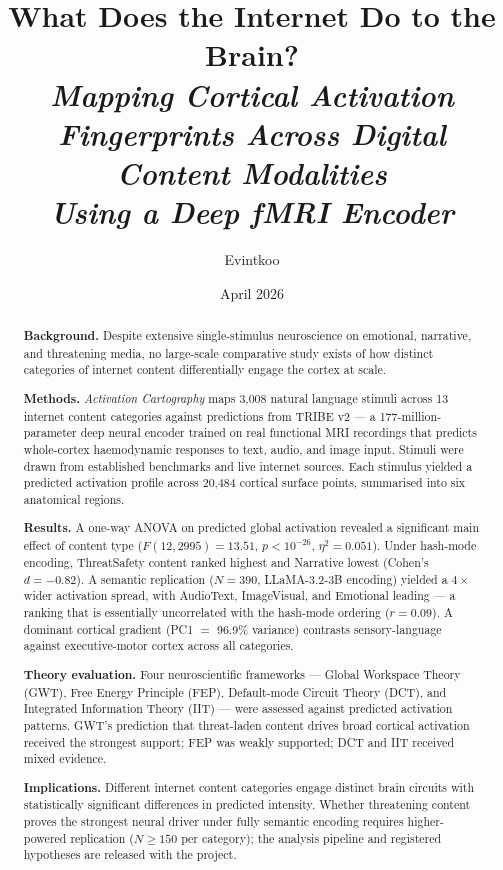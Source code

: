 \documentclass[11pt,letterpaper]{article}
\title{%
  \vspace{-1.0em}
  {\sffamily\bfseries\LARGE What Does the Internet Do to the Brain?}\\[0.5em]
  {\large\itshape Mapping Cortical Activation Fingerprints Across Digital Content Modalities\\[0.15em]
   Using a Deep fMRI Encoder}%
  \vspace{-0.6em}
}
\author[1]{Evintkoo}
\affil[1]{\small Independent Research \\ \href{mailto:evint.koo@gmail.com}{\texttt{evint.koo@gmail.com}}}
\date{\small April 2026}
\numberwithin{equation}{section}
\begin{document}
\maketitle
\thispagestyle{fancy}

\vspace{-0.8em}

\begin{abstract}
\small
\noindent\textbf{Background.} Despite extensive single-stimulus neuroscience on emotional, narrative, and threatening media, no large-scale comparative study exists of how distinct categories of internet content differentially engage the cortex at scale.

\noindent\textbf{Methods.} \textit{Activation Cartography} maps 3{,}008 natural language stimuli across 13 internet content categories against predictions from TRIBE v2 — a 177-million-parameter deep neural encoder trained on real functional MRI recordings that predicts whole-cortex haemodynamic responses to text, audio, and image input. Stimuli were drawn from established benchmarks and live internet sources. Each stimulus yielded a predicted activation profile across 20{,}484 cortical surface points, summarised into six anatomical regions.

\noindent\textbf{Results.} A one-way ANOVA on predicted global activation revealed a significant main effect of content type ($F(12, 2995) = 13.51$, $p < 10^{-26}$, $\eta^2 = 0.051$). Under hash-mode encoding, ThreatSafety content ranked highest and Narrative lowest (Cohen's $d = -0.82$). A semantic replication ($N = 390$, LLaMA-3.2-3B encoding) yielded a $4\times$ wider activation spread, with AudioText, ImageVisual, and Emotional leading — a ranking that is essentially uncorrelated with the hash-mode ordering ($r = 0.09$). A dominant cortical gradient (PC1 $=$ 96.9\% variance) contrasts sensory-language against executive-motor cortex across all categories.

\noindent\textbf{Theory evaluation.} Four neuroscientific frameworks — Global Workspace Theory (GWT), Free Energy Principle (FEP), Default-mode Circuit Theory (DCT), and Integrated Information Theory (IIT) — were assessed against predicted activation patterns. GWT's prediction that threat-laden content drives broad cortical activation received the strongest support; FEP was weakly supported; DCT and IIT received mixed evidence.

\noindent\textbf{Implications.} Different internet content categories engage distinct brain circuits with statistically significant differences in predicted intensity. Whether threatening content proves the strongest neural driver under fully semantic encoding requires higher-powered replication ($N \geq 150$ per category); the analysis pipeline and registered hypotheses are released with the project.
\end{abstract}
\end{document}
